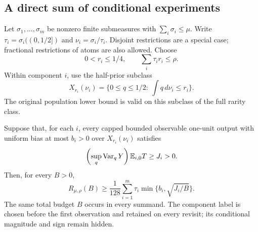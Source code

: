 \subsection{A direct sum of conditional experiments}

Let $\sigma_1,\ldots,\sigma_m$ be nonzero finite submeasures with
$\sum_i\sigma_i\le\mu$. Write $\tau_i=\sigma_i((0,1/2])$ and
$\nu_i=\sigma_i/\tau_i$. Disjoint restrictions are a special case;
fractional restrictions of atoms are also allowed. Choose
\[
 0<r_i\le1/4,\qquad \sum_i\tau_i r_i\le\rho.
\]
Within component $i$, use the half-prior subclass
\[
 X_{r_i}(\nu_i)=\{0\le q\le1/2:\ \textstyle\int q\,d\nu_i\le r_i\}.
\]
The original population lower bound is valid on this subclass of the full
rarity class.

\begin{theorem}\label{thm:additive-localization}
Suppose that, for each $i$, every capped bounded observable one-unit output
with uniform bias at most $b_i>0$ over $X_{r_i}(\nu_i)$ satisfies
\[
 \left(\sup_q\operatorname{Var}_qY\right)\mathbb E_{i,0}T\ge J_i>0.
\]
Then, for every $B>0$,
\begin{equation}\label{eq:additive-localization}
 \boxed{\quad
 R_{\mu,\rho}(B)\ge\frac1{128}
 \sum_{i=1}^m\tau_i\min\{b_i,\sqrt{J_i/B}\}.
 \quad}
\end{equation}
The same total budget $B$ occurs in every summand. The component label
is chosen before the first observation and retained on every revisit;
its conditional magnitude and sign remain hidden.
\end{theorem}

